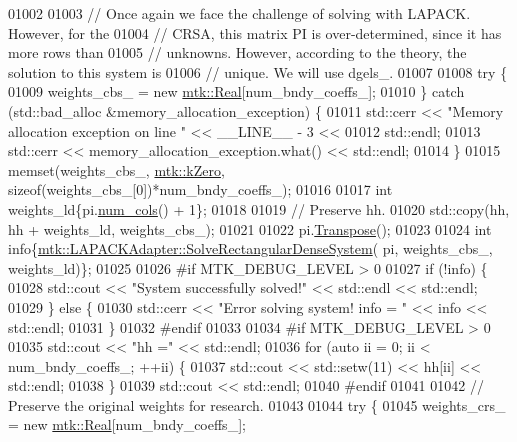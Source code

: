\begin{DoxyCode}
{{01002 
01003   \textcolor{comment}{// Once again we face the challenge of solving with LAPACK. However, for the}
01004   \textcolor{comment}{// CRSA, this matrix PI is over-determined, since it has more rows than}
01005   \textcolor{comment}{// unknowns. However, according to the theory, the solution to this system is}
01006   \textcolor{comment}{// unique. We will use dgels\_.}
01007 
01008   \textcolor{keywordflow}{try} \{
01009     weights\_cbs\_ = \textcolor{keyword}{new} \hyperlink{group__c01-roots_gac080bbbf5cbb5502c9f00405f894857d}{mtk::Real}[num\_bndy\_coeffs\_];
01010   \} \textcolor{keywordflow}{catch} (std::bad\_alloc &memory\_allocation\_exception) \{
01011     std::cerr << \textcolor{stringliteral}{"Memory allocation exception on line "} << \_\_LINE\_\_ - 3 <<
01012       std::endl;
01013     std::cerr << memory\_allocation\_exception.what() << std::endl;
01014   \}
01015   memset(weights\_cbs\_, \hyperlink{group__c01-roots_ga59a451a5fae30d59649bcda274fea271}{mtk::kZero}, \textcolor{keyword}{sizeof}(weights\_cbs\_[0])*num\_bndy\_coeffs\_);
01016 
01017   \textcolor{keywordtype}{int} weights\_ld\{pi.\hyperlink{classmtk_1_1DenseMatrix_a41747502d468c6728a4be31501b16e0e}{num\_cols}() + 1\};
01018 
01019   \textcolor{comment}{// Preserve hh.}
01020   std::copy(hh, hh + weights\_ld, weights\_cbs\_);
01021 
01022   pi.\hyperlink{classmtk_1_1DenseMatrix_a71d9c07ca66e88d97d1fd5012f43138b}{Transpose}();
01023 
01024   \textcolor{keywordtype}{int} info\{\hyperlink{classmtk_1_1LAPACKAdapter_a380f148ffdf96bae2f79ae28f1a6560c}{mtk::LAPACKAdapter::SolveRectangularDenseSystem}(
      pi, weights\_cbs\_, weights\_ld)\};
01025 
01026 \textcolor{preprocessor}{  #if MTK\_DEBUG\_LEVEL > 0}
01027   \textcolor{keywordflow}{if} (!info) \{
01028     std::cout << \textcolor{stringliteral}{"System successfully solved!"} << std::endl << std::endl;
01029   \} \textcolor{keywordflow}{else} \{
01030     std::cerr << \textcolor{stringliteral}{"Error solving system! info = "} << info << std::endl;
01031   \}
01032 \textcolor{preprocessor}{  #endif}
01033 
01034 \textcolor{preprocessor}{  #if MTK\_DEBUG\_LEVEL > 0}
01035   std::cout << \textcolor{stringliteral}{"hh ="} << std::endl;
01036   \textcolor{keywordflow}{for} (\textcolor{keyword}{auto} ii = 0; ii < num\_bndy\_coeffs\_; ++ii) \{
01037     std::cout << std::setw(11) << hh[ii] << std::endl;
01038   \}
01039   std::cout << std::endl;
01040 \textcolor{preprocessor}{  #endif}
01041 
01042   \textcolor{comment}{// Preserve the original weights for research.}
01043 
01044   \textcolor{keywordflow}{try} \{
01045     weights\_crs\_ = \textcolor{keyword}{new} \hyperlink{group__c01-roots_gac080bbbf5cbb5502c9f00405f894857d}{mtk::Real}[num\_bndy\_coeffs\_];
}}
\end{DoxyCode}
